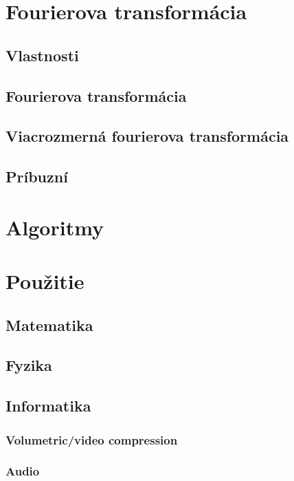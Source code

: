 



\chapter{Fourierova transformácia}
    
    
    
\section{Vlastnosti}
\section{Fourierova transformácia}
\section{Viacrozmerná fourierova transformácia}
\section{Príbuzní}

\chapter{Algoritmy}
    
    
    
    
    
    
    
    
    
    

\chapter{Použitie}
\section{Matematika}
    
    
    
    
    
         
\section{Fyzika}
    
    
    
    
    
\section{Informatika}
    
    
    
    \subsection{Volumetric/video compression}
    \subsection{Audio}
     
    
